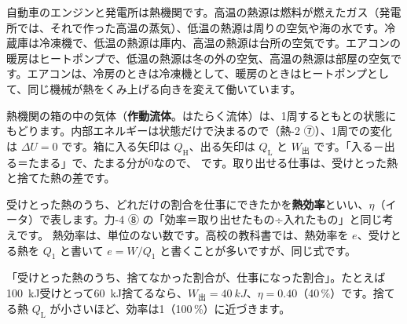 \begin{phmijika}
自動車のエンジンと発電所は熱機関です。高温の熱源は燃料が燃えたガス（発電所では、それで作った高温の蒸気）、低温の熱源は周りの空気や海の水です。冷蔵庫は冷凍機で、低温の熱源は庫内、高温の熱源は台所の空気です。エアコンの暖房はヒートポンプで、低温の熱源は冬の外の空気、高温の熱源は部屋の空気です。エアコンは、冷房のときは冷凍機として、暖房のときはヒートポンプとして、同じ機械が熱をくみ上げる向きを変えて働いています。
\end{phmijika}

\label{ph:熱-5:sec2}
熱機関の箱の中の気体（\textbf{作動流体}。はたらく流体）は、1周するともとの状態にもどります。内部エネルギーは状態だけで決まるので（熱-2 ⑦）、1周での変化は $\Delta U=0$ です。箱に入る矢印は $Q_{\mathrm H}$、出る矢印は $Q_{\mathrm L}$ と $W_{\text{出}}$ です。「入る－出る＝たまる」で、たまる分が0なので、
です。取り出せる仕事は、受けとった熱と捨てた熱の差です。

受けとった熱のうち、どれだけの割合を仕事にできたかを\textbf{熱効率}といい、$\eta$（イータ）で表します。力-4 ⑧ の「効率＝取り出せたもの÷入れたもの」と同じ考えです。
\label{ph:熱-5:kouritsu}\label{ph:熱-5:cycle}熱効率は、単位のない数です。高校の教科書では、熱効率を $e$、受けとる熱を $Q_1$ と書いて $e=W/Q_1$ と書くことが多いですが、同じ式です。

\begin{phflow}[サイクルの熱効率]
\end{phflow}

\begin{phyomi}[$\eta=1-Q_{\mathrm L}/Q_{\mathrm H}$]
「受けとった熱のうち、捨てなかった割合が、仕事になった割合」。たとえば\qty{100}{kJ}受けとって\qty{60}{kJ}捨てるなら、$W_{\text{出}}=\qty{40}{kJ}$、$\eta=0.40$（40\,\%）です。捨てる熱 $Q_{\mathrm L}$ が小さいほど、効率は1（100\,\%）に近づきます。
\end{phyomi}

